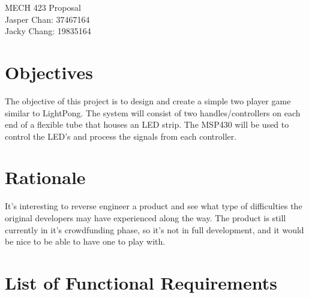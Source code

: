 \documentclass{notes}
\begin{document}
\vspace*{\fill}
\begin{center}
{\centering\huge{MECH 423 Proposal}}\\
\vspace*{2em}
{\large Jasper Chan: 37467164 }\\
{\large Jacky Chang: 19835164 }
\end{center}
\vspace*{\fill}
\newpage
\section{Objectives}

The objective of this project is to design and create a simple two player game similar to LightPong\footnotemark.
The system will consist of two handles/controllers on each end of a flexible tube that houses an LED strip.
The MSP430 will be used to control the LED's and process the signals from each controller.

\section{Rationale}

It's interesting to reverse engineer a product and see what type of difficulties the original developers may have experienced along the way.
The product is still currently in it's crowdfunding phase, so it's not in full development, and it would be nice to be able to have one to play with.

\section{List of Functional Requirements}
\end{document}
